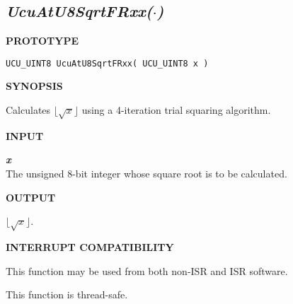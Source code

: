 \subsection[\emph{UcuAtU8SqrtFRxx(\protect\mbox{\protect$\cdot$})}]
           {\emph{UcuAtU8SqrtFRxx(\protect\mbox{\protect\boldmath $\cdot$})}}
\label{cafn0:ssre0:suee0}

%

\noindent\textbf{PROTOTYPE}
\begin {list}{}{\setlength{\leftmargin}{0.25in}\setlength{\topsep}{0.0in}}
\item
\begin{verbatim}
UCU_UINT8 UcuAtU8SqrtFRxx( UCU_UINT8 x )
\end{verbatim}
\end{list}
\vspace{2.8ex}

\noindent\textbf{SYNOPSIS}
\begin{list}{}{\setlength{\leftmargin}{0.25in}\setlength{\topsep}{0.0in}}
\item
Calculates $\lfloor \sqrt{x} \rfloor$ using a 4-iteration
trial squaring algorithm.
\end{list}
\vspace{2.8ex}

\noindent\textbf{INPUT}
\begin{list}{}{\setlength{\leftmargin}{0.5in}\setlength{\itemindent}{-0.25in}\setlength{\topsep}{0.0in}\setlength{\partopsep}{0.0in}}
\item \emph{\textbf{x}}\\
      The unsigned 8-bit integer whose square root is to be calculated.
\end{list}
\vspace{2.8ex}

\noindent\textbf{OUTPUT}
\begin{list}{}{\setlength{\leftmargin}{0.25in}\setlength{\topsep}{0.0in}}
\item $\lfloor \sqrt{x} \rfloor$.
\end{list}
\vspace{2.8ex}

\noindent\textbf{INTERRUPT COMPATIBILITY}
\begin{list}{}{\setlength{\leftmargin}{0.25in}\setlength{\topsep}{0.0in}}
\item This function may be used from both non-ISR and ISR software.
\item This function is thread-safe.
\end{list}
\vspace{2.8ex}

